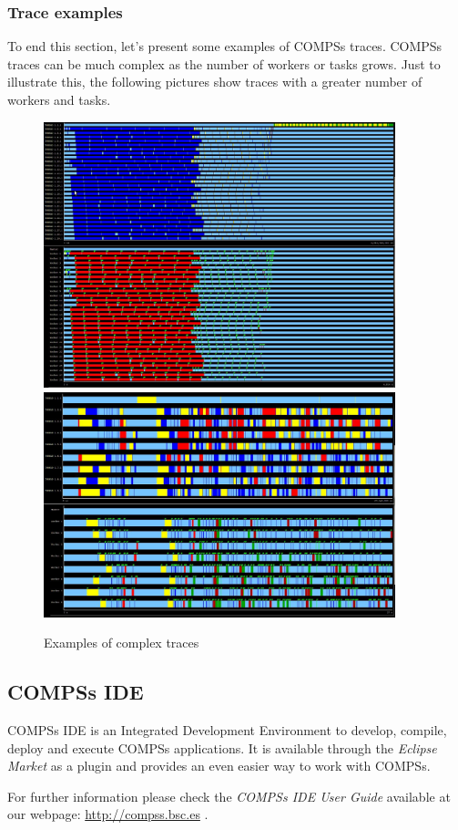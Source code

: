 \subsubsection{Trace examples}
To end this section, let’s present some examples of COMPSs traces. COMPSs traces can be 
much complex as the number of workers or tasks grows. Just to illustrate this, the following 
pictures show traces with a greater number of workers and tasks.

\begin{figure}[ht!]
  \centering
    \includegraphics[width=0.91\textwidth]{./Sections/4_Tools/Figures/trace_example1.jpeg}
    \includegraphics[width=0.91\textwidth]{./Sections/4_Tools/Figures/trace_example2.jpeg}
    \caption{Examples of complex traces}
\end{figure}

\newpage
\subsection{COMPSs IDE}
\label{subsec:IDE}
COMPSs IDE is an Integrated Development Environment to develop, compile, deploy and execute COMPSs applications. It is available
through the \textit{Eclipse Market} as a plugin and provides an even easier way to work with COMPSs.

For further information please check the \textit{COMPSs IDE User Guide} available at our webpage: \url{http://compss.bsc.es} .
